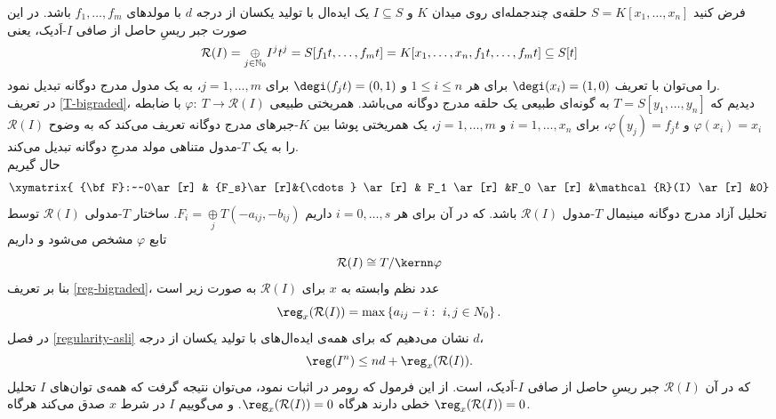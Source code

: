 \begin{remark}\label{rees-reg}
فرض کنید $S=K[x_1,\ldots,x_n]$ حلقه‌ی چندجمله‌ای‌ روی میدان $K$ و $I\subseteq S$ یک ایده‌ال با تولید یکسان از درجه $d$ با مولد‌های $f_1,\ldots,f_m$ باشد. در این صورت جبر ریسِ حاصل از صافی $I$-‌اَدیک، یعنی 
$$\mathcal{R}(I)=\underset{j\in \Bbb N_0}{\oplus}I^j t^j=S[f_1t,\ldots,f_mt]=K[x_1,\ldots,x_n,f_1t,\ldots,f_mt]\subseteq S[t]$$
را می‌توان با تعریف $\degi(x_i)=(1,0)$ برای هر 
$1\leq i\leq n$
و $\degi(f_jt)=(0,1)$ برای 
$j=1,\ldots,m$،
به یک مدول مدرج دوگانه تبدیل نمود.\\
در تعریف \ref{T-bigraded}،
دیدیم که $T=S[y_1,\ldots,y_n]$ به گونه‌ای طبیعی یک حلقه مدرج دوگانه می‌باشد.
همریختی طبیعی
$\varphi:~T\longrightarrow \mathcal{R}(I)$
با ضابطه $\varphi(x_i)=x_i$ و $\varphi(y_j)=f_jt$، برای $i=1,\ldots,x_n$ و $j=1,\ldots,m$، یک همریختی پوشا بین $K$-‌جبرهای مدرج دوگانه تعریف می‌کند
که به وضوح $\mathcal{R}(I)$
را به یک $T$-‌مدول متناهی مولد مدرجِ دوگانه تبدیل می‌کند.\\
حال گیریم 
\begin{displaymath}
\xymatrix{
{\bf F}:~~0\ar[r] & {F_s}\ar[r]&{\cdots} \ar[r] & F_1 \ar[r] &F_0 \ar[r] &\mathcal{R}(I) \ar[r] &0}
\end{displaymath}
تحلیل آزاد مدرج دوگانه مینیمال $T$-‌مدول $\mathcal{R}(I)$ باشد.
که در آن برای هر
$i=0,\ldots,s$
داریم
$F_i=\underset{j}{\oplus}T(-a_{ij},-b_{ij})$.
ساختار $T$-مدولی  
$\mathcal{R}(I)$
توسط تابع $\varphi$ مشخص می‌شود و داریم
$$\mathcal{R}(I)\cong T/{\kernn\varphi}$$
بنا بر تعریف
\ref{reg-bigraded}،
 عدد نظم وابسته به $x$ برای $\mathcal{R}(I)$ به صورت زیر است
$$\reg_x(\mathcal{R}(I))=\max\left\{a_{ij}-i:~i,j\in N_0\right\}.$$
در فصل \ref{regularity-asli} نشان می‌دهیم که برای همه‌ی ایده‌ال‌های با تولید یکسان از درجه $d$،
$$\reg(I^n)\leq nd+\reg_x(\mathcal{R}(I)).$$
که در آن $\mathcal{R}(I)$
جبر ریسِ حاصل از صافی $I$-‌اَدیک، است. از این فرمول که رومر
در 
\cite{romer}
اثبات نمود، می‌توان نتیجه گرفت که همه‌ی توان‌های $I$ تحلیل خطی دارند هرگاه 
$\reg_x(\mathcal{R}(I))=0$.
و می‌گوییم $I$ در شرط $x$ صدق می‌کند هرگاه 
$\reg_x(\mathcal{R}(I))=0$.\\
\end{remark}